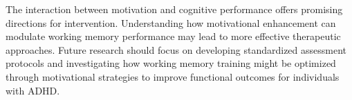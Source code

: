 \documentclass[stu]{apa7}
\begin{document}
The interaction between motivation and cognitive performance \parencite{engelmann_motivation_2007} offers promising directions for intervention. Understanding how motivational enhancement can modulate working memory performance may lead to more effective therapeutic approaches. Future research should focus on developing standardized assessment protocols and investigating how working memory training might be optimized through motivational strategies to improve functional outcomes for individuals with ADHD.

\printbibliography
\end{document}
